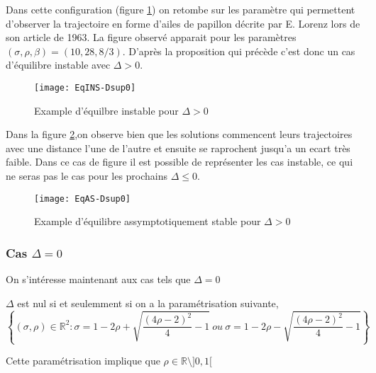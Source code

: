 \documentclass{article}
\newcommand{\R}{\mathbb{R}}
\newtheorem[M , nocut]{prop}{Proposition}[section]
\newtheorem[M]{propt}{Propriété}[section]
\newtheorem[L , nocut]{thm}{Théoreme}
\newtheorem[L]{cor}{Corollaire}
\begin{document}
\begin{example} 
    Dans cette configuration (figure \ref{fig:EqINS-Dsup0}) on retombe sur les paramètre qui permettent d'observer la trajectoire en forme d'ailes de papillon décrite par E. Lorenz lors de son article de 1963. La figure observé apparait pour les paramètres $(\sigma,\rho,\beta) = (10,28,8/3)$. D'après la proposition qui précède c'est donc un cas d'équilibre instable avec $\Delta>0$.

    \begin{figure}[!ht]
        \centering
        \texttt{[image: EqINS-Dsup0]}
        \caption{Example d'équilbre instable pour $\Delta>0$}
        \label{fig:EqINS-Dsup0}
    \end{figure}

    Dans la figure \ref{fig:EqAS-Dsup0},on observe bien que les solutions commencent leurs trajectoires avec une distance l'une de l'autre et ensuite se raprochent jusqu'a un ecart très faible. Dans ce cas de figure il est possible de représenter les cas instable, ce qui ne seras pas le cas pour les prochains $\Delta \le 0$.
    
    \begin{figure}[!ht]
        \centering
        \texttt{[image: EqAS-Dsup0]}
        \caption{Example d'équilibre assymptotiquement stable pour $\Delta>0$}
        \label{fig:EqAS-Dsup0}
    \end{figure}
    
\end{example}

\subsubsection*{Cas $\Delta = 0$}
On s'intéresse maintenant aux cas tels que $\Delta=0$

\begin{prop} 
    \label{prop:Deg0}
    $\Delta$ est nul si et seulemment si on a la paramétrisation suivante,
    \[
        \left\{(\sigma,\rho)\in \R ^2 :\sigma = 1-2 \rho + \sqrt{ \frac{(4\rho-2)^2}{4} -1 }\ ou\ \sigma = 1-2 \rho - \sqrt{ \frac{(4\rho-2)^2}{4} -1 } \right\}  
    \]
\end{prop}

\begin{example}[Remarque]
    Cette paramétrisation implique que $\rho \in \R \setminus ]0,1[$ 
\end{example}
\end{document}
